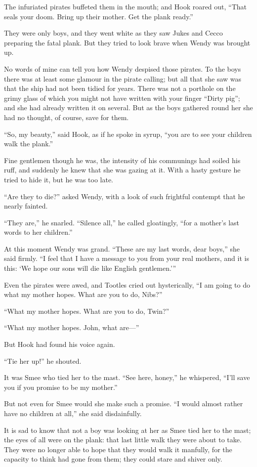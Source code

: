 The infuriated pirates buffeted them in the mouth;
and Hook roared out, “That seals your doom.
Bring up their mother.
Get the plank ready.”

They were only boys,
and they went white as they saw Jukes and Cecco preparing the fatal plank.
But they tried to look brave when Wendy was brought up.

No words of mine can tell you how Wendy despised those pirates.
To the boys there was at least some glamour in the pirate calling;
but all that she saw was that the ship had not been tidied for years.
There was not a porthole on the grimy glass of which you might not have written with your finger “Dirty pig”;
and she had already written it on several.
But as the boys gathered round her she had no thought, of course, save for them.

“So, my beauty,” said Hook, as if he spoke in syrup,
“you are to see your children walk the plank.”

Fine gentlemen though he was, the intensity of his communings had soiled his ruff,
and suddenly he knew that she was gazing at it.
With a hasty gesture he tried to hide it, but he was too late.

“Are they to die?\@” asked Wendy,
with a look of such frightful contempt that he nearly fainted.

“They are,” he snarled.
“Silence all,” he called gloatingly, “for a mother’s last words to her children.”

At this moment Wendy was grand.
“These are my last words, dear boys,” she said firmly.
“I feel that I have a message to you from your real mothers, and it is this:
‘We hope our sons will die like English gentlemen.’”

Even the pirates were awed, and Tootles cried out hysterically,
“I am going to do what my mother hopes.
What are you to do, Nibs?”

“What my mother hopes.
What are you to do, Twin?”

“What my mother hopes.
John, what are—”

But Hook had found his voice again.

“Tie her up!\@” he shouted.

It was Smee who tied her to the mast.
“See here, honey,” he whispered,
“I’ll save you if you promise to be my mother.”

But not even for Smee would she make such a promise.
“I would almost rather have no children at all,” she said disdainfully.

It is sad to know that not a boy was looking at her as Smee tied her to the mast;
the eyes of all were on the plank:
that last little walk they were about to take.
They were no longer able to hope that they would walk it manfully,
for the capacity to think had gone from them;
they could stare and shiver only.


